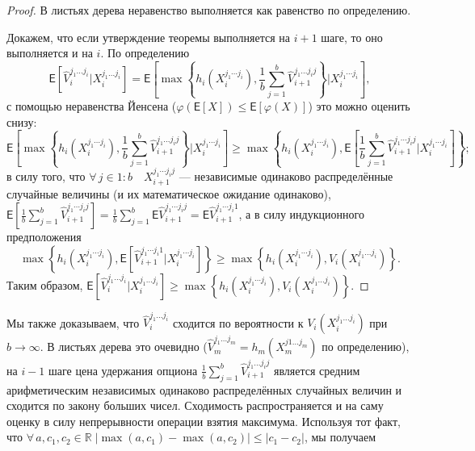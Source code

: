 \documentclass[specialist,
               substylefile = spbu.rtx,
               subf,href,colorlinks=true, 12pt]{disser}
\newcommand{\ev}{\mathsf{E}}
\begin{document}
		\begin{proof}
			\par В листьях дерева неравенство выполняется как равенство по определению.
			\par Докажем, что если утверждение теоремы выполняется на $i+1$ шаге, то оно выполняется и на $i$. По определению
			\begin{equation*}
			\ev\left[\hat{V}_i^{j_1\ldots j_i}|X_i^{j_1\ldots j_i}\right] = \ev\left[ \max\left\lbrace h_i\left(X_i^{j_1\cdots j_i}\right), \frac{1}{b}\sum_{j = 1}^b \hat{V}_{i+1}^{j_1 \ldots j_i j}\right\rbrace | X_i^{j_1\cdots j_i} \right],
			\end{equation*}
			с помощью неравенства Йенсена ($\varphi\left(\ev\left[X\right]\right) \leqslant \ev\left[\varphi(X)\right]$) это можно оценить снизу:
			\begin{equation*}
			\ev\left[ \max\left\lbrace h_i\left(X_i^{j_1\cdots j_i}\right), \frac{1}{b}\sum_{j = 1}^b \hat{V}_{i+1}^{j_1 \ldots j_i j}\right\rbrace | X_i^{j_1\cdots j_i} \right] \geq \max\left\lbrace h_i\left(X_i^{j_1\cdots j_i}\right), \ev\left[ \frac{1}{b}\sum_{j = 1}^b \hat{V}_{i+1}^{j_1 \cdots j_i j} | X_i^{j_1\cdots j_i} \right] \right\rbrace ;
			\end{equation*}
			в силу того, что $\forall \, j \in 1:b \quad X_{i+1}^{j_1\cdots j_i j}$ --- независимые одинаково распределённые случайные величины (и их математическое ожидание одинаково), $\ev\left[ \frac{1}{b}\sum_{j = 1}^b \hat{V}_{i+1}^{j_1 \cdots j_i j} \right] = \frac{1}{b}\sum_{j = 1}^b \ev\hat{V}_{i+1}^{j_1 \cdots j_i j} = \ev\hat{V}_{i+1}^{j_1 \cdots j_i 1}$, а в силу индукционного предположения
			\begin{equation*}
			\max\left\lbrace h_i\left(X_i^{j_1\cdots j_i}\right), \ev\left[ \hat{V}_{i+1}^{j_1 \cdots j_i 1} | X_i^{j_1\cdots j_i} \right] \right\rbrace \geq \max \left\lbrace h_i\left(X_i^{j_1\cdots j_i}\right), V_i\left(X_i^{j_1\ldots j_i}\right) \right\rbrace .
			\end{equation*}
			Таким образом, $\ev\left[\hat{V}_i^{j_1\ldots j_i}|X_i^{j_1\ldots j_i}\right] \geq \max \left\lbrace h_i\left(X_i^{j_1\cdots j_i}\right), V_i\left(X_i^{j_1\ldots j_i}\right) \right\rbrace$.
		\end{proof}
		\par Мы также доказываем, что $\hat{V}_i^{j_1\ldots j_i}$ сходится по вероятности к $V_i\left(X_i^{j_1\ldots j_i}\right)$ при $b \to \infty$. В листьях дерева это очевидно ($\hat{V}_m^{j_1 \ldots j_m} = h_m\left(X_m^{j1 \ldots j_m}\right)$ по определению), на $i-1$ шаге цена удержания опциона $\frac{1}{b} \sum_{j = 1}^b \hat{V}_{i+1}^{j_1 \ldots j_i j}$ является средним арифметическим независимых одинаково распределённых случайных величин и сходится по закону больших чисел. Сходимость распространяется и на саму оценку в силу непрерывности операции взятия максимума. Используя тот факт, что $\forall \, a, c_1, c_2 \in \mathbb{R} \; |\max\left(a, c_1\right) - \max\left(a, c_2\right)| \leqslant |c_1 - c_2|$, мы получаем
\end{document}
